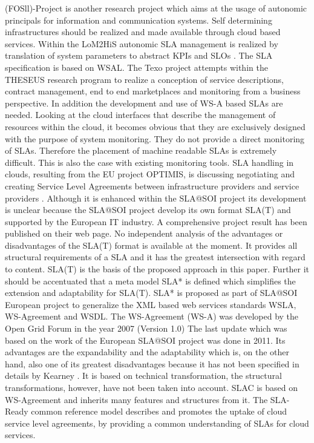 (FOSll)-Project  \cite{fosii} is another research project which aims at the usage of autonomic principals for information and communication systems. Self determining infrastructures should be realized and made available through cloud based services. Within the LoM2HiS autonomic SLA management is realized by translation of system parameters to abstract KPIs and SLOs   \cite{Brandic:2009:VFE:1616056.1616063}. The SLA specification is based on WSAL. The Texo project  \cite{texo2011} attempts within the THESEUS research program to realize a conception of service descriptions, contract management, end to end marketplaces and monitoring from a business perspective. In addition the development and use of WS-A based SLAs are needed. Looking at the cloud interfaces that describe the management of resources within the cloud, it becomes obvious that they are exclusively designed with the purpose of system monitoring. They do not provide a direct monitoring of SLAs. Therefore the placement of machine readable SLAs is extremely difficult. This is also the case with existing monitoring tools. SLA handling in clouds, resulting from the EU project OPTIMIS, is discussing negotiating and creating Service Level Agreements between infrastructure providers and service providers  \cite{Lawrence:2010:USL:2050107.2050112}. Although it is enhanced within the SLA@SOI project  \cite{slasoi2011} its development is unclear because the SLA@SOI project develop its own format SLA(T)  \cite{slasoiwiki} and supported by the European IT industry. A comprehensive project result has been published on their web page. No independent analysis of the advantages or disadvantages of the SLA(T) format is available at the moment. It provides all structural requirements of a SLA and it has the greatest intersection with regard to content. SLA(T) is the basis of the proposed approach in this paper. Further it should be accentuated that a meta model SLA*  \cite{slasoisrc} is defined which simplifies the extension and adaptability for SLA(T). SLA* is proposed as part of SLA@SOI European project to generalize the XML based web services standards WSLA, WS-Agreement and WSDL. The WS-Agreement (WS-A) was developed by the Open Grid Forum in the year 2007 (Version 1.0) The last update which was based on the work of the European SLA@SOI project was done in 2011. Its advantages are the expandability and the adaptability which is, on the other hand, also one of its greatest disadvantages because it has not been specified in details by Kearney  \cite{Kearney2011b}. It is based on technical transformation, the structural transformations, however, have not been taken into account. SLAC  \cite{uriarte2014slac} is based on WS-Agreement and inherits many features and structures from it. The SLA-Ready \cite{SLA-Ready} common reference model describes and promotes the uptake of cloud service level agreements, by providing a common understanding of SLAs for cloud services.



